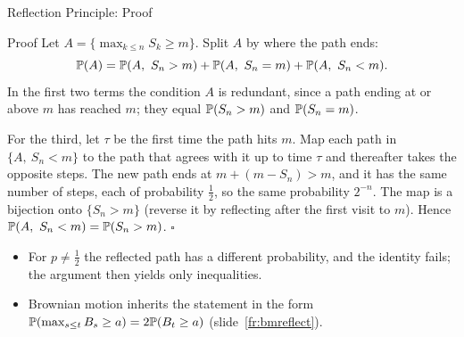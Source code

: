 \begin{frame}{Reflection Principle: Proof}
  \label{fr:reflectproof}
  \small
  \begin{block}{Proof}
    Let $A=\{\max_{k\le n}S_k\ge m\}$. Split $A$ by where the path ends:
    \[
      \Prob(A)=\Prob(A,\ S_n>m)+\Prob(A,\ S_n=m)+\Prob(A,\ S_n<m).
    \]
    In the first two terms the condition $A$ is redundant, since a path ending at or above $m$ has reached $m$; they equal $\mathbb{P}(S_n>m)$ and $\mathbb{P}(S_n=m)$.

    \smallskip
    For the third, let $\tau$ be the first time the path hits $m$. Map each path in $\{A,\ S_n<m\}$ to the path that agrees with it up to time $\tau$ and thereafter takes the opposite steps. The new path ends at $m+(m-S_n)>m$, and it has the same number of steps, each of probability $\tfrac12$, so the same probability $2^{-n}$. The map is a bijection onto $\{S_n>m\}$ (reverse it by reflecting after the first visit to $m$). Hence $\Prob(A,\ S_n<m)=\Prob(S_n>m)$. \hfill$\square$
  \end{block}
  \begin{itemize}
    \item For $p\ne\tfrac12$ the reflected path has a different probability, and the identity fails; the argument then yields only inequalities.
    \item Brownian motion inherits the statement in the form $\mathbb{P}(\max_{s\le t}B_s\ge a)=2\mathbb{P}(B_t\ge a)$ (slide~\ref{fr:bmreflect}).
  \end{itemize}
\end{frame}

